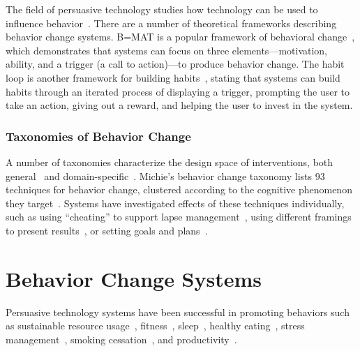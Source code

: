 
The field of persuasive technology studies how technology can be used to influence behavior~\cite{fogg2002persuasive}.
 There are a number of theoretical frameworks describing behavior change systems. B=MAT is a popular framework of behavioral change~\cite{fogg2002persuasive}, which demonstrates that systems can focus on three elements---motivation, ability, and a trigger (a call to action)---to produce behavior change. The habit loop is another framework for building habits~\cite{eyal2014hooked}, stating that systems can build habits through an iterated process of displaying a trigger, prompting the user to take an action, giving out a reward, and helping the user to invest in the system.

\subsubsection{Taxonomies of Behavior Change}

A number of taxonomies characterize the design space of interventions, both general~\cite{michie2013behavior, behaviourchangewheel, abraham2008taxonomy, dolanmindspace} and domain-specific~\cite{hardeman2000interventions, west2010behavior}. Michie's behavior change taxonomy lists 93 techniques for behavior change, clustered according to the cognitive phenomenon they target~\cite{michie2013behavior}. Systems have investigated effects of these techniques individually, such as using ``cheating'' to support lapse management~\cite{agapie2016staying}, using different framings to present results~\cite{kim2016timeaware}, or setting goals and plans~\cite{agapie2016plansourcing}.

\section{Behavior Change Systems}

Persuasive technology systems have been successful in promoting behaviors such as sustainable resource usage~\cite{froehlich2009ubigreen}, fitness~\cite{consolvo2008activity}, sleep~\cite{kay2012lullaby,choe2011opportunities}, healthy eating~\cite{noronha2011platemate,epstein2016crumbs}, stress management~\cite{adams2014towards,sanches2010mind}, smoking cessation~\cite{paay2015personal}, and productivity~\cite{whittaker2016don, kim2016timeaware}.

